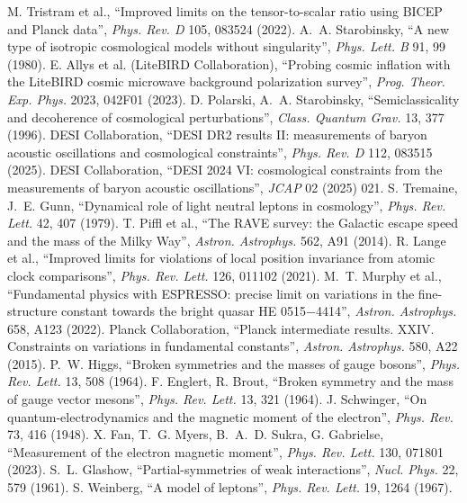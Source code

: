  M. Tristram et al., ``Improved limits on the tensor-to-scalar ratio using BICEP and Planck data'', \emph{Phys. Rev. D}
105, 083524 (2022).
 A.~A. Starobinsky, ``A new type of isotropic cosmological models without singularity'', \emph{Phys. Lett. B} 91,
99 (1980).
 E. Allys et al. (LiteBIRD Collaboration), ``Probing cosmic inflation with the LiteBIRD cosmic microwave background
polarization survey'', \emph{Prog. Theor. Exp. Phys.} 2023, 042F01 (2023).
 D. Polarski, A.~A. Starobinsky, ``Semiclassicality and decoherence of cosmological perturbations'', \emph{Class. Quantum
Grav.} 13, 377 (1996).
 DESI Collaboration, ``DESI DR2 results II: measurements of baryon acoustic oscillations and cosmological constraints'',
\emph{Phys. Rev. D} 112, 083515 (2025).
 DESI Collaboration, ``DESI 2024 VI: cosmological constraints from the measurements of baryon acoustic oscillations'',
\emph{JCAP} 02 (2025) 021.
 S. Tremaine, J.~E. Gunn, ``Dynamical role of light neutral leptons in cosmology'', \emph{Phys. Rev. Lett.} 42, 407
(1979).
 T. Piffl et al., ``The RAVE survey: the Galactic escape speed and the mass of the Milky Way'', \emph{Astron. Astrophys.}
562, A91 (2014).
 R. Lange et al., ``Improved limits for violations of local position invariance from atomic clock comparisons'',
\emph{Phys. Rev. Lett.} 126, 011102 (2021).
 M.~T. Murphy et al., ``Fundamental physics with ESPRESSO: precise limit on variations in the fine-structure constant
towards the bright quasar HE 0515$-$4414'', \emph{Astron. Astrophys.} 658, A123 (2022).
 Planck Collaboration, ``Planck intermediate results. XXIV. Constraints on variations in fundamental constants'',
\emph{Astron. Astrophys.} 580, A22 (2015).
 P.~W. Higgs, ``Broken symmetries and the masses of gauge bosons'', \emph{Phys. Rev. Lett.} 13, 508 (1964).
 F. Englert, R. Brout, ``Broken symmetry and the mass of gauge vector mesons'', \emph{Phys. Rev. Lett.} 13, 321 (1964).
 J. Schwinger, ``On quantum-electrodynamics and the magnetic moment of the electron'', \emph{Phys. Rev.} 73, 416
(1948).
 X. Fan, T.~G. Myers, B.~A.~D. Sukra, G. Gabrielse, ``Measurement of the electron magnetic moment'', \emph{Phys. Rev. Lett.}
130, 071801 (2023).
 S.~L. Glashow, ``Partial-symmetries of weak interactions'', \emph{Nucl. Phys.} 22, 579 (1961).
 S. Weinberg, ``A model of leptons'', \emph{Phys. Rev. Lett.} 19, 1264 (1967).

